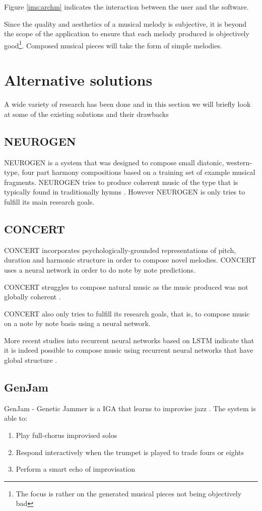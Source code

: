 Figure \ref{ims:archm} indicates the interaction between the user and the software.

Since the quality and aesthetics of a musical melody is subjective, it is beyond the scope of the application to ensure that each melody produced is objectively good\footnote{The focus is rather on the generated musical pieces not being objectively bad}. Composed musical pieces will take the form of simple melodies.

\section{Alternative solutions}
A wide variety of research has been done and in this section we will briefly look at some of the existing solutions and their drawbacks

\subsection{NEUROGEN}
NEUROGEN is a system that was designed to compose small diatonic, western-type, four part harmony compositions based on a training set of example musical fragments. NEUROGEN tries to produce coherent music of the type that is typically found in traditionally hymns \cite{gibson1991neurogen}.
However NEUROGEN is only tries to fulfill its main research goals.

\subsection{CONCERT}
CONCERT incorporates psychologically-grounded representations of pitch, duration and harmonic structure in order to compose novel melodies. CONCERT uses a neural network in order to do note by note predictions. 

CONCERT struggles to compose natural music as the music produced was not globally coherent \cite{mozer1994neural}. 

CONCERT also only tries to fulfill its research goals, that is, to compose music on a note by note basis using a neural network.

More recent studies into recurrent neural networks based on \ac{LSTM} indicate that it is indeed possible to compose music using recurrent neural networks that have global structure \cite{Eck2002}.

\subsection{GenJam}
GenJam - Genetic Jammer is a \acs{IGA} that learns to improvise jazz \cite{Biles1994}.
The system is able to: 
\begin{enumerate}
\item Play full-chorus improvised solos
\item Respond interactively when the trumpet is played to trade fours or eights
\item Perform a smart echo of improvisation
\end{enumerate}

